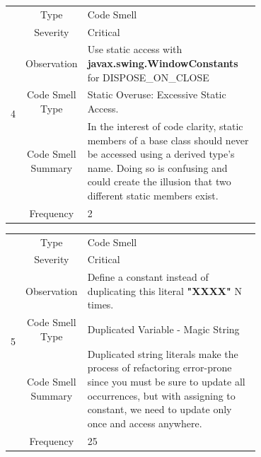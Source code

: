 \documentclass[12pt,letterpaper]{report}
\begin{document}
\begin{table}
    \begin{tabular}{|c|c|p{0.7\linewidth}|}
    \hline   
    \multirow{6}{*}{4}
        & Type & Code Smell \\
    \cline{2-3}
        & Severity & Critical \\
    \cline{2-3}
       & Observation & Use static access with \textbf{javax.swing.WindowConstants} for DISPOSE\_ON\_CLOSE \\
    \cline{2-3}
       & Code Smell Type &  Static Overuse: Excessive Static Access. \\
    \cline{2-3}
       & Code Smell Summary & In the interest of code clarity, static members of a base class should never be accessed using a derived type’s name. Doing so is confusing and could create the illusion that two different static members exist. \\
    \cline{2-3}
       & Frequency & 2 \\
    \hline
    \end{tabular}
\end{table}

\begin{table}
    \begin{tabular}{|c|c|p{0.7\linewidth}|}
    \hline   
    \multirow{6}{*}{5}
        & Type & Code Smell \\
    \cline{2-3}
        & Severity & Critical \\
    \cline{2-3}
       & Observation & Define a constant instead of duplicating this literal \textbf{"XXXX"} N times. \\
    \cline{2-3}
       & Code Smell Type &  Duplicated Variable - Magic String \\
    \cline{2-3}
       & Code Smell Summary & Duplicated string literals make the process of refactoring error-prone since you must be sure to update all occurrences, but with assigning to constant, we need to update only once and access anywhere. \\
    \cline{2-3}
       & Frequency & 25 \\
    \hline
    \end{tabular}
\end{table}
\end{document}
